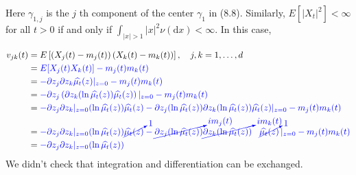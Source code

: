 \documentclass[a4paper,11pt]{article}
\begin{document}
Here $\gamma_{1, j}$ is the $j$ th
component of the center $\gamma_{1}$ in (8.8). Similarly, $E\left[\left|X_{t}\right|^{2}\right]<\infty$
for all $t>0$ if and only if $\int_{|x|>1}|x|^{2} \nu(\mathrm{d} x)<\infty$. In this case,

{ \small
        \begin{align*}
            v_{j k}(t) & =E\left[\left(X_{j}(t)-m_{j}(t)\right)\left(X_{k}(t)-m_{k}(t)\right)\right], \quad j, k=1, \ldots, d                                                                                                                                                                                                                                      \\
                       & = \textcolor{blue}{ E[X_{j}(t)X_{k}(t)] - m_{j}(t)m_{k}(t)}                                                                                                                                                                                                                                                                               \\
                       & = \textcolor{blue}{  -\partial z_{j} \partial z_{k} \widehat{\mu_{t}}(z)|_{z=0} - m_{j}(t)m_{k}(t)}                                                                                                                                                                                                                                       \\
                       & = \textcolor{blue}{  -\partial z_{j} \left( \partial z_{k} (\ln \widehat{\mu_{t}}(z)) \widehat{\mu_{t}}(z) \right) |_{z=0} - m_{j}(t)m_{k}(t)}                                                                                                                                                                                            \\
                       & = \textcolor{blue}{  -\partial z_{j} \partial z_{k}|_{z=0} (\ln \widehat{\mu_{t}}(z)) \widehat{\mu_{t}}(z)   -\partial z_{j}( \ln\widehat{\mu_{t}}(z) )\partial z_{k}( \ln\widehat{\mu_{t}}(z) )\widehat{\mu_{t}}(z)|_{z=0} - m_{j}(t)m_{k}(t)}                                                                                           \\
                       & = \textcolor{blue}{  -\partial z_{j} \partial z_{k}|_{z=0} (\ln \widehat{\mu_{t}}(z)) \cancelto{1}{\widehat{\mu_{t}}(z)}   -\cancelto{i m_{j}(t)}{\partial z_{j}( \ln\widehat{\mu_{t}}(z) )}\cancelto{im_{k}(t)}{\partial z_{k}( \ln\widehat{\mu_{t}}(z) )} \hspace{0.3cm}\cancelto{1}{\widehat{\mu_{t}}(z)}\,|_{z=0} - m_{j}(t)m_{k}(t)} \\
                       & = \textcolor{blue}{  -\partial z_{j} \partial z_{k}|_{z=0} (\ln \widehat{\mu_{t}}(z)) }
        \end{align*}
        We didn't check that integration and differentiation can be exchanged.
    }
\end{document}

